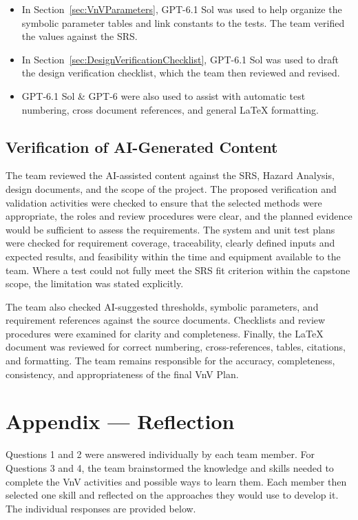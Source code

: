 \documentclass[10pt,titlepage]{article}
\begin{document}
\begin{itemize}
  \item In Section~\ref{sec:VnVParameters}, GPT-6.1 Sol was used to help
  organize the symbolic parameter tables and link constants to the tests.
  The team verified the values against the SRS.

  \item In Section~\ref{sec:DesignVerificationChecklist}, GPT-6.1 Sol was used
  to draft the design verification checklist, which the team then reviewed
  and revised.

  \item GPT-6.1 Sol \& GPT-6 were also used to assist with automatic test numbering,
  cross document references, and general \LaTeX{} formatting.
\end{itemize}

\subsection{Verification of AI-Generated Content}

The team reviewed the AI-assisted content against the SRS, Hazard Analysis,
design documents, and the scope of the project. The proposed verification and
validation activities were checked to ensure that the selected methods were
appropriate, the roles and review procedures were clear, and the planned
evidence would be sufficient to assess the requirements. The system and unit
test plans were checked for requirement coverage, traceability, clearly defined
inputs and expected results, and feasibility within the time and equipment
available to the team. Where a test could not fully meet the SRS fit criterion
within the capstone scope, the limitation was stated explicitly.

The team also checked AI-suggested thresholds, symbolic parameters, and
requirement references against the source documents. Checklists and review
procedures were examined for clarity and completeness. Finally, the \LaTeX{}
document was reviewed for correct numbering, cross-references, tables,
citations, and formatting. The team remains responsible for the accuracy,
completeness, consistency, and appropriateness of the final VnV Plan.

\newpage{}

\section{Appendix --- Reflection}

Questions 1 and 2 were answered individually by each team member. For
Questions 3 and 4, the team brainstormed the knowledge and skills needed to
complete the VnV activities and possible ways to learn them. Each member then
selected one skill and reflected on the approaches they would use to develop it.
The individual responses are provided below.
\end{document}
